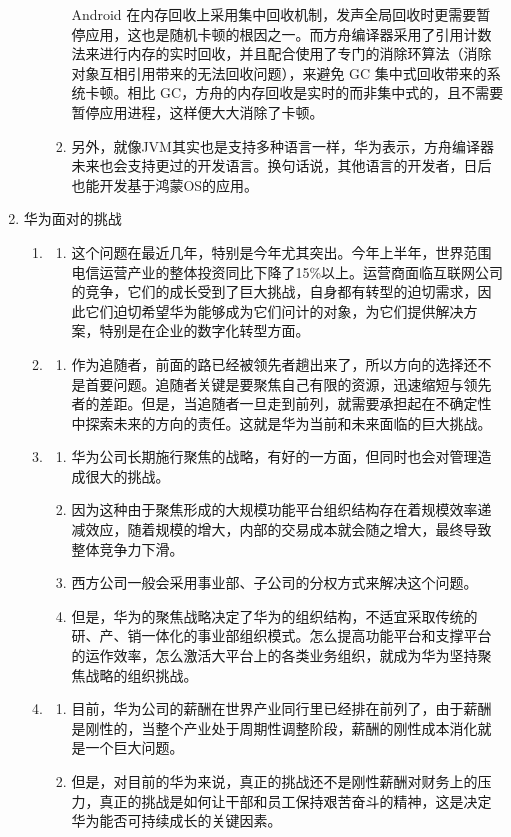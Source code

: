 \documentclass{article}
\begin{document}
\begin{enumerate}
\begin{enumerate}
\begin{enumerate}
Android 在内存回收上采用集中回收机制，发声全局回收时更需要暂停应用，这也是随机卡顿的根因之一。而方舟编译器采用了引用计数法来进行内存的实时回收，并且配合使用了专门的消除环算法（消除对象互相引用带来的无法回收问题），来避免 GC 集中式回收带来的系统卡顿。相比 GC，方舟的内存回收是实时的而非集中式的，且不需要暂停应用进程，这样便大大消除了卡顿。
    \item 另外，就像JVM其实也是支持多种语言一样，华为表示，方舟编译器未来也会支持更过的开发语言。换句话说，其他语言的开发者，日后也能开发基于鸿蒙OS的应用。
\end{enumerate}
\end{enumerate}
    \item 华为面对的挑战
\begin{enumerate}
    \item \begin{enumerate}挑战一：如何帮助客户转型和取得商业成功
    \item 这个问题在最近几年，特别是今年尤其突出。今年上半年，世界范围电信运营产业的整体投资同比下降了15\%以上。运营商面临互联网公司的竞争，它们的成长受到了巨大挑战，自身都有转型的迫切需求，因此它们迫切希望华为能够成为它们问计的对象，为它们提供解决方案，特别是在企业的数字化转型方面。
\end{enumerate}
    \item \begin{enumerate}挑战二：如何创新与管理不确定性
    \item 作为追随者，前面的路已经被领先者趟出来了，所以方向的选择还不是首要问题。追随者关键是要聚焦自己有限的资源，迅速缩短与领先者的差距。但是，当追随者一旦走到前列，就需要承担起在不确定性中探索未来的方向的责任。这就是华为当前和未来面临的巨大挑战。
\end{enumerate}
    \item \begin{enumerate}挑战三：如何简化管理、激活组织
    \item 华为公司长期施行聚焦的战略，有好的一方面，但同时也会对管理造成很大的挑战。
    \item 因为这种由于聚焦形成的大规模功能平台组织结构存在着规模效率递减效应，随着规模的增大，内部的交易成本就会随之增大，最终导致整体竞争力下滑。
    \item 西方公司一般会采用事业部、子公司的分权方式来解决这个问题。
    \item 但是，华为的聚焦战略决定了华为的组织结构，不适宜采取传统的研、产、销一体化的事业部组织模式。怎么提高功能平台和支撑平台的运作效率，怎么激活大平台上的各类业务组织，就成为华为坚持聚焦战略的组织挑战。
\end{enumerate}
    \item \begin{enumerate}挑战四：如何保持员工长期艰苦奋斗
    \item 目前，华为公司的薪酬在世界产业同行里已经排在前列了，由于薪酬是刚性的，当整个产业处于周期性调整阶段，薪酬的刚性成本消化就是一个巨大问题。
    \item 但是，对目前的华为来说，真正的挑战还不是刚性薪酬对财务上的压力，真正的挑战是如何让干部和员工保持艰苦奋斗的精神，这是决定华为能否可持续成长的关键因素。
\end{enumerate}
\end{enumerate}
\end{enumerate}
\end{document}
